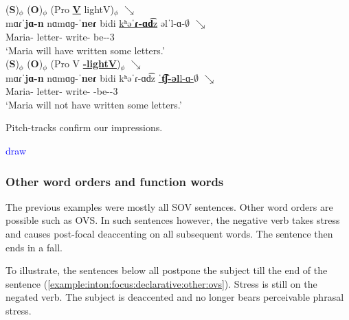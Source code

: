 \begin{exe}
	\ex \begin{xlist}
		\ex \glll (\textbf{S})$_\phi$ (\textbf{O})$_\phi$ (Pro \textbf{\underline{V}} lightV)$_\phi$ $\searrow$ \\
		mɑɾˈ\textbf{jɑ-n} nɑmɑɡ-ˈ\textbf{neɾ}  bidi \underline{kʰəˈ\textbf{ɾ-ɑd͡}z} əlˈl-ɑ-$\emptyset$ $\searrow$\\
		Maria-{} letter-{\pl} {\fut} write-{\rptcp} be-{\thgloss}-3{\sg}  \\
		\trans `Maria will have written some letters.' 
		\label{example:inton:focus:declarative:complex:have:pos}
		\\ 
		\ex \glll (\textbf{S})$_\phi$ (\textbf{O})$_\phi$ (Pro V \underline{\textbf{{\neggloss}-lightV}})$_\phi$ $\searrow$ \\
		mɑɾˈ\textbf{jɑ-n} nɑmɑɡ-ˈ\textbf{neɾ}  bidi {kʰəˈɾ-ɑd͡z} \underline{ˈ\textbf{t͡ʃ-əl}l-ɑ-$\emptyset$}  $\searrow$\\
		Maria-{} letter-{\pl} {\fut} write-{\rptcp} {\neggloss}-be-{\thgloss}-3{\sg}  \\
		\trans `Maria will not have   written some letters.' 
		\label{example:inton:focus:declarative:complex:have:neg}
		\\ 
		
	\end{xlist}
\end{exe}

Pitch-tracks confirm our impressions. 


\textcolor{blue}{draw}

\subsubsection{Other word orders and function words}\label{section:intonation:focus:declarative:otherWord}

The previous examples were mostly all SOV sentences. Other word orders are possible such as OVS. In such sentences however, the negative verb takes stress and causes post-focal deaccenting on all subsequent words. The sentence then ends in a fall. 

To illustrate, the sentences below all postpone the subject till the end of the sentence (\ref{example:inton:focus:declarative:other:ovs}). Stress is still on the negated verb. The subject is deaccented and no longer bears perceivable phrasal stress. 

